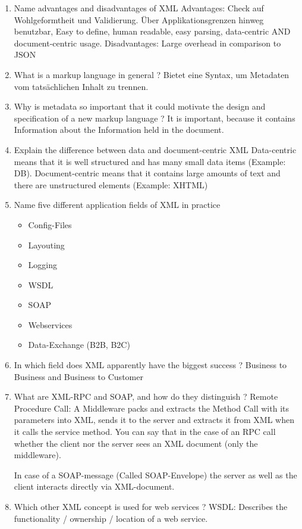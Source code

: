 \begin{enumerate}
\item Name advantages and disadvantages of XML
\subitem Advantages: Check auf Wohlgeformtheit und Validierung. Über Applikationsgrenzen hinweg benutzbar, Easy to define, human readable, easy parsing, data-centric AND document-centric usage. Disadvantages: Large overhead in comparison to JSON
\item What is a markup language in general ?
\subitem Bietet eine Syntax, um Metadaten vom tatsächlichen Inhalt zu trennen.
\item Why is metadata so important that it could motivate the design and specification of a new markup language ?
\subitem It is important, because it contains Information about the Information held in the document.
\item Explain the difference between data and document-centric XML
\subitem Data-centric means that it is well structured and has many small data items (Example: DB). Document-centric means that it contains large amounts of text and there are unstructured elements (Example: XHTML)
\item Name five different application fields of XML in practice
\subitem \begin{itemize}
\item Config-Files
\item Layouting
\item Logging
\item WSDL
\item SOAP
\item Webservices
\item Data-Exchange (B2B, B2C)
\end{itemize}
\item In which field does XML apparently have the biggest success ?
\subitem Business to Business and Business to Customer
\item What are XML-RPC and SOAP, and how do they distinguish ?
\subitem Remote Procedure Call: A Middleware packs and extracts the Method Call with its parameters into XML, sends it to the server and extracts it from XML when it calls the service method. You can say that in the case of an RPC call whether the client nor the server sees an XML document (only the middleware).

In case of a SOAP-message (Called SOAP-Envelope) the server as well as the client interacts directly via XML-document.
\item Which other XML concept is used for web services ?
\subitem WSDL: Describes the functionality / ownership / location of a web service.
\end{enumerate}